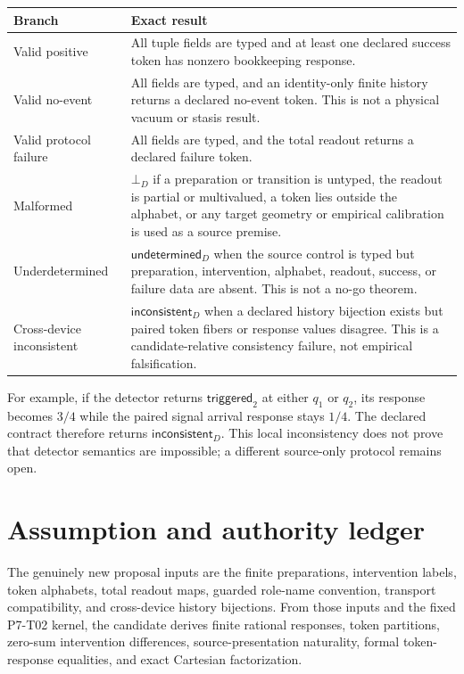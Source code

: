 \documentclass[11pt]{article}
\newcommand{\Malformed}{\bot_D}
\newcommand{\Undetermined}{\mathsf{undetermined}_D}
\newcommand{\Inconsistent}{\mathsf{inconsistent}_D}
\begin{document}
\begin{longtable}{p{}p{}}
\toprule
Branch & Exact result\\
\midrule
\endhead
Valid positive &
All tuple fields are typed and at least one declared success token has
nonzero bookkeeping response.\\
Valid no-event &
All fields are typed, and an identity-only finite history returns a declared
no-event token. This is not a physical vacuum or stasis result.\\
Valid protocol failure &
All fields are typed, and the total readout returns a declared failure token.\\
Malformed &
\(\Malformed\) if a preparation or transition is untyped, the readout is
partial or multivalued, a token lies outside the alphabet, or any target
geometry or empirical calibration is used as a source premise.\\
Underdetermined &
\(\Undetermined\) when the source control is typed but preparation,
intervention, alphabet, readout, success, or failure data are absent. This is
not a no-go theorem.\\
Cross-device inconsistent &
\(\Inconsistent\) when a declared history bijection exists but paired token
fibers or response values disagree. This is a candidate-relative consistency
failure, not empirical falsification.\\
\bottomrule
\end{longtable}

For example, if the detector returns \(\mathsf{triggered}_2\) at either
\(q_1\) or \(q_2\), its response becomes \(3/4\) while the paired signal
arrival response stays \(1/4\). The declared contract therefore returns
\(\Inconsistent\). This local inconsistency does not prove that detector
semantics are impossible; a different source-only protocol remains open.

\section{Assumption and authority ledger}

The genuinely new proposal inputs are the finite preparations, intervention
labels, token alphabets, total readout maps, guarded role-name convention,
transport compatibility, and cross-device history bijections. From those
inputs and the fixed P7-T02 kernel, the candidate derives finite rational
responses, token partitions, zero-sum intervention differences,
source-presentation naturality, formal token-response equalities, and exact
Cartesian factorization.
\end{document}

